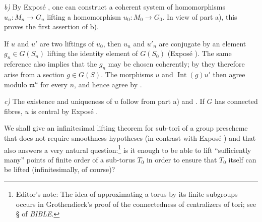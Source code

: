 \emph{b)} By Exposé , one can construct a coherent system of
homomorphisms \(u_n:M_n\to G_n\) lifting a homomorphism
\(u_0:M_0\to G_0\). In view of part a), this proves the first assertion
of b).

If \(u\) and \(u'\) are two liftings of \(u_0\), then \(u_n\) and
\(u'_n\) are conjugate by an element \(g_n\in G(S_n)\) lifting the
identity element of \(G(S_0)\) (Exposé ). The same reference
also implies that the \(g_n\) may be chosen coherently; by  they
therefore arise from a section \(g\in G(S)\). The morphisms \(u\) and
\(\operatorname{Int}(g)u'\) then agree modulo \(\mathfrak m^n\) for
every \(n\), and hence agree by .

\emph{c)} The existence and uniqueness of \(u\) follow from part a)
and . If \(G\) has connected fibres, \(u\) is central by
Exposé .



We shall give an infinitesimal lifting theorem for sub-tori of a group
prescheme that does not require smoothness hypotheses (in contrast
with Exposé ) and that also answers a very natural
question:\footnote{Editor's note: The idea of approximating a torus by
its finite subgroups occurs in Grothendieck's proof of the
connectedness of centralizers of tori; see § of \emph{BIBLE}.}
is it enough to be able to lift ``sufficiently many'' points of finite
order of a sub-torus \(T_0\) in order to ensure that \(T_0\) itself can
be lifted (infinitesimally, of course)?


